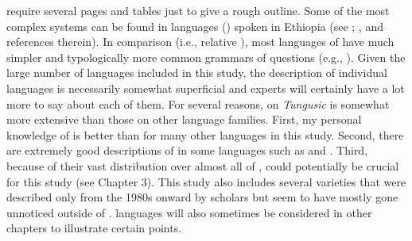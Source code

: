 require several pages and tables just to give a rough outline. Some of the most complex systems can be found in \textit{} languages () spoken in Ethiopia (see \citealt{Amha2012}; \citealt{Köhler2013,Köhler2016}, and references therein). In comparison (i.e., relative ), most languages of  have much simpler and typologically more common grammars of questions (e.g., \citealt{Miestamo2008}). Given the large number of languages included in this study, the description of individual languages is necessarily somewhat superficial and experts will certainly have a lot more to say about each of them. For several reasons,  on \textit{Tungusic} is somewhat more extensive than those on other language families. First, my personal knowledge of  is better than for many other languages in this study. Second, there are extremely good descriptions of  in some  languages such as  and . Third, because of their vast distribution over almost all of ,  could potentially be crucial for this study (see Chapter 3). This study also includes several varieties that were described only from the 1980s onward by  scholars but seem to have mostly gone unnoticed outside of .  languages will also sometimes be considered in other chapters to illustrate certain points.

